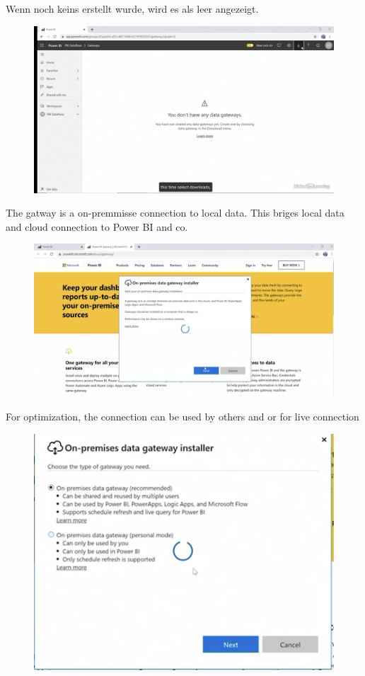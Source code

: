 Wenn noch keins erstellt wurde, wird es als leer angezeigt.

\begin{figure}[H]
	\centering
	\includegraphics[scale = 0.3]{attachment/chapter_1/Scc122}
\end{figure}

The gatway is a on-premmisse connection to local data. This briges local data and cloud connection to Power BI and co.
\begin{figure}[H]
	\centering
	\includegraphics[scale = 0.3]{attachment/chapter_1/Scc124}
\end{figure}

For optimization, the connection can be used by others and or for live connection
\begin{figure}[H]
	\centering
	\includegraphics[scale = 0.3]{attachment/chapter_1/Scc125}
\end{figure}



